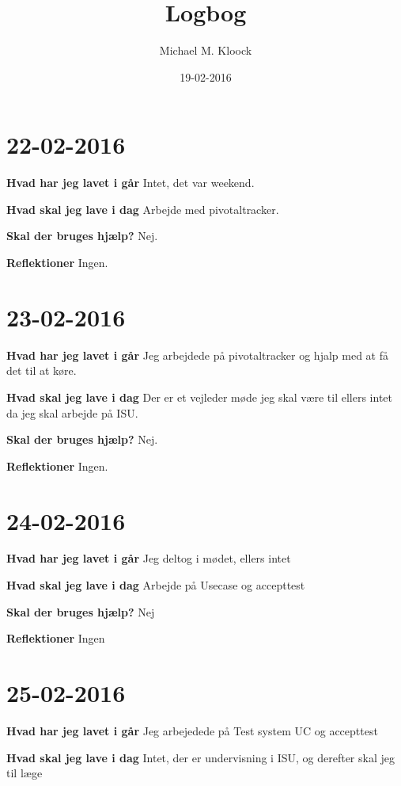 \documentclass{article}
\title{Logbog}
\author{Michael M. Kloock}
\date{19-02-2016}
\begin{document}
	\maketitle
	\tableofcontents
	
	\section{22-02-2016}
	
	\textbf{Hvad har jeg lavet i går}	
	\textnormal Intet, det var weekend.	
	
	\textbf{Hvad skal jeg lave i dag}	
	\textnormal Arbejde med pivotaltracker.	
	
	\textbf{Skal der bruges hjælp?}	
	\textnormal Nej.
	
	\textbf{Reflektioner}	
	\textnormal Ingen.
	
	\section{23-02-2016}
	
	\textbf{Hvad har jeg lavet i går}	
	\textnormal Jeg arbejdede på pivotaltracker og hjalp med at få det til at køre.	
	
	\textbf{Hvad skal jeg lave i dag}	
	\textnormal Der er et vejleder møde jeg skal være til ellers intet da jeg skal arbejde på ISU.
	
	\textbf{Skal der bruges hjælp?}
	\textnormal Nej.
	
	\textbf{Reflektioner}	
	\textnormal Ingen.
	
	\section{24-02-2016}
	
	\textbf{Hvad har jeg lavet i går} Jeg deltog i mødet, ellers intet
	
	\textbf{Hvad skal jeg lave i dag} Arbejde på Usecase og accepttest
	
	\textbf{Skal der bruges hjælp?} Nej
	
	\textbf{Reflektioner} Ingen
	
	\section{25-02-2016}
	
	\textbf{Hvad har jeg lavet i går} Jeg arbejedede på Test system UC og accepttest
	
	\textbf{Hvad skal jeg lave i dag} Intet, der er undervisning i ISU, og derefter skal jeg til læge
	
\end{document}
